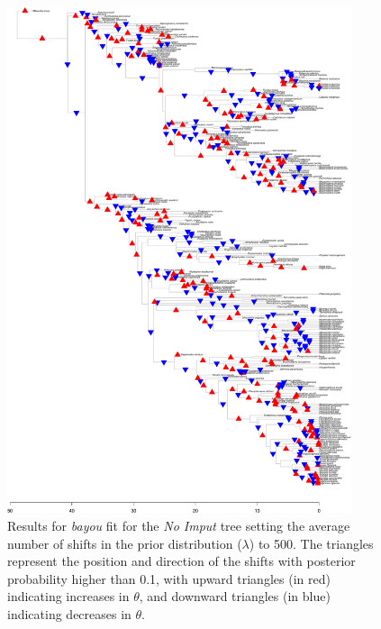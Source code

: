 \begin{figure}[H]
\includegraphics[width=0.9\textwidth]{img/plots-noimput-wZBL-k500-1.pdf}
\caption{Results for \textit{bayou} fit for the \textit{No Imput} tree setting the average number of shifts in the prior distribution ($\lambda$) to 500. The triangles represent the position and direction of the shifts with posterior probability higher than 0.1, with upward triangles (in red) indicating increases in $\theta$, and downward triangles (in blue) indicating decreases in $\theta$.}
\label{fig:noimput-k500}
\end{figure}

